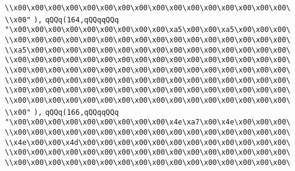 \verb|\\x00\x00\x00\x00\x00\x00\x00\x00\x00\x00\x00\x00\x00\x00\x00\x00\|\newline
\verb|\\x00"|\newline
\verb|),|\newline
\verb|qQQq(164,qQQqqQQq|\newline
\verb|"\x00\x00\x00\x00\x00\x00\x00\x00\x00\xa5\x00\x00\xa5\x00\x00\x00\|\newline
\verb|\\x00\x00\x00\x00\x00\x00\x00\x00\x00\x00\x00\x00\x00\x00\x00\x00\|\newline
\verb|\\xa5\x00\x00\x00\x00\x00\x00\x00\x00\x00\x00\x00\x00\x00\x00\x00\|\newline
\verb|\\x00\x00\x00\x00\x00\x00\x00\x00\x00\x00\x00\x00\x00\x00\x00\x00\|\newline
\verb|\\x00\x00\x00\x00\x00\x00\x00\x00\x00\x00\x00\x00\x00\x00\x00\x00\|\newline
\verb|\\x00\x00\x00\x00\x00\x00\x00\x00\x00\x00\x00\x00\x00\x00\x00\x00\|\newline
\verb|\\x00\x00\x00\x00\x00\x00\x00\x00\x00\x00\x00\x00\x00\x00\x00\x00\|\newline
\verb|\\x00\x00\x00\x00\x00\x00\x00\x00\x00\x00\x00\x00\x00\x00\x00\x00\|\newline
\verb|\\x00"|\newline
\verb|),|\newline
\verb|qQQq(166,qQQqqQQq|\newline
\verb|"\x00\x00\x00\x00\x00\x00\x00\x00\x00\x4e\xa7\x00\x4e\x00\x00\x00\|\newline
\verb|\\x00\x00\x00\x00\x00\x00\x00\x00\x00\x00\x00\x00\x00\x00\x00\x00\|\newline
\verb|\\x4e\x00\x00\x4d\x00\x00\x00\x00\x00\x00\x00\x00\x00\x00\x00\x00\|\newline
\verb|\\x00\x00\x00\x00\x00\x00\x00\x00\x00\x00\x00\x00\x00\x00\x00\x00\|\newline
\verb|\\x00\x00\x00\x00\x00\x00\x00\x00\x00\x00\x00\x00\x00\x00\x00\x00\|\newline
